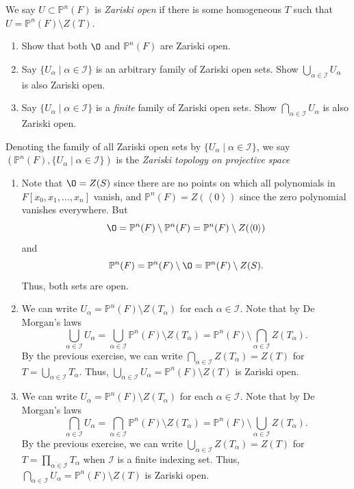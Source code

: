 \documentclass[12 pt, letterpaper]{hmcpset}
\begin{document}
\pagebreak

\begin{problem}[Problem 4.]
	We say $U \subset \mathbb{P}^{n}(F)$ is \emph{Zariski open} if there is some homogeneous $T$ such that $U = \mathbb{P}^{n}(F) \setminus Z(T)$.
	\begin{enumerate}
		\item Show that both $\O$ and $\mathbb{P}^{n}(F)$ are Zariski open.
		\item Say $\{ U_{\alpha} \mid \alpha \in \mathcal{I} \}$ is an arbitrary family of Zariski open sets. Show $\bigcup_{\alpha \in \mathcal{I}} U_{\alpha}$ is also Zariski open.
		\item Say $\{ U_{\alpha} \mid \alpha \in \mathcal{I} \}$ is a \emph{finite} family of Zariski open sets. Show $\bigcap_{\alpha \in \mathcal{I}} U_{\alpha}$ is also Zariski open.
	\end{enumerate}
	Denoting the family of all Zariski open sets by $\{ U_{\alpha} \mid \alpha \in \mathcal{I} \}$, we say $(\mathbb{P}^{n}(F), \{ U_{\alpha} \mid \alpha \in \mathcal{I} \})$ is the \emph{Zariski topology on projective space}
\end{problem}

\begin{solution}
	\begin{enumerate}
		\item Note that $\O = Z(S)$ since there are no points on which all polynomials in  $F[x_{0}, x_{1}, \dots, x_{n}]$ vanish, and $\mathbb{P}^{n}(F) = Z(\left < 0 \right >)$ since the zero polynomial vanishes everywhere. But  
			\[
				\O =  \mathbb{P}^{n}(F) \setminus \mathbb{P}^{n}(F) = \mathbb{P}^{n}(F) \setminus Z(\left < 0 \right >)
			\]
			and
			\[
				\mathbb{P}^{n}(F) = \mathbb{P}^{n}(F) \setminus \O = \mathbb{P}^{n}(F) \setminus Z(S).
			\]
			Thus, both sets are open.
		\item We can write $U_{\alpha} = \mathbb{P}^{n}(F) \setminus Z(T_{\alpha})$ for each $\alpha \in \mathcal{I}$. Note that by De Morgan's laws
			\[
				\bigcup_{\alpha \in \mathcal{I}} U_{\alpha} = \bigcup_{\alpha \in \mathcal{I}} \mathbb{P}^{n}(F) \setminus Z(T_{\alpha}) = \mathbb{P}^{n}(F) \setminus \bigcap_{\alpha \in \mathcal{I}} Z(T_{\alpha}).
			\]
			By the previous exercise, we can write $\bigcap_{\alpha \in \mathcal{I}} Z(T_{\alpha}) = Z(T)$ for $T = \bigcup_{\alpha \in \mathcal{I}} T_{\alpha}$. Thus, $\bigcup_{\alpha \in \mathcal{I}} U_{\alpha} = \mathbb{P}^{n}(F) \setminus Z(T)$ is Zariski open.
		\item We can write $U_{\alpha} = \mathbb{P}^{n}(F) \setminus Z(T_{\alpha})$ for each $\alpha \in \mathcal{I}$. Note that by De Morgan's laws
			\[
				\bigcap_{\alpha \in \mathcal{I}} U_{\alpha} = \bigcap_{\alpha \in \mathcal{I}} \mathbb{P}^{n}(F) \setminus Z(T_{\alpha}) = \mathbb{P}^{n}(F) \setminus \bigcup_{\alpha \in \mathcal{I}} Z(T_{\alpha}).
			\]
			By the previous exercise, we can write $\bigcup_{\alpha \in \mathcal{I}} Z(T_{\alpha}) = Z(T)$ for $T = \prod_{\alpha \in \mathcal{I}} T_{\alpha}$ when $\mathcal{I}$ is a finite indexing set. Thus, $\bigcap_{\alpha \in \mathcal{I}} U_{\alpha} = \mathbb{P}^{n}(F) \setminus Z(T)$ is Zariski open.
	\end{enumerate}
\end{solution}
\end{document}
